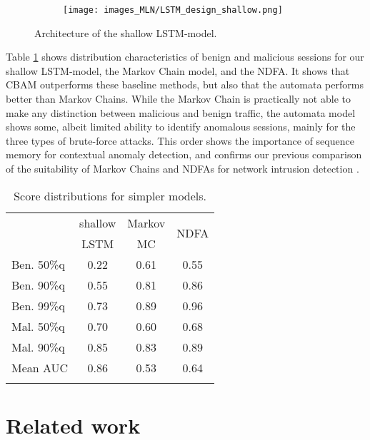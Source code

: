 \begin{figure}
\centering
\begin{subfigure}[b]{0.4\textwidth}
\texttt{[image: images\_MLN/LSTM\_design\_shallow.png]}
\end{subfigure}
\quad
\small
\caption{Architecture of the shallow LSTM-model.}\label{fig:rnn_FSA2}
\end{figure}
Table \ref{tab:Simpcomptab} shows distribution characteristics of benign and malicious sessions for our shallow LSTM-model, the Markov Chain model, and the NDFA. It shows that CBAM outperforms these baseline methods, but also that the automata performs better than Markov Chains. While the Markov Chain is practically not able to make any distinction between malicious and benign traffic, the automata model shows some, albeit limited ability to identify anomalous sessions, mainly for the three types of brute-force attacks. This order shows the importance of sequence memory for contextual anomaly detection, and confirms our previous comparison of the suitability of Markov Chains and NDFAs for network intrusion detection \cite{grov2019towards}.
\begin{table}[ht]
\centering
\begin{tabular}{l|ccc}
\hline
&shallow&Markov&\multirow{2}{*}{NDFA}\\
&LSTM&MC&\\
\hline
Ben. 50\%q&0.22&0.61&0.55\\[0.2cm]
Ben. 90\%q&0.55&0.81&0.86\\[0.2cm]
Ben. 99\%q&0.73&0.89&0.96\\[0.2cm]
Mal. 50\%q&0.70&0.60&0.68\\[0.2cm]
Mal. 90\%q&0.85&0.83&0.89\\[0.2cm]
Mean AUC&0.86&0.53&0.64\\ \hline
\multicolumn{2}{c}{ }
\end{tabular}
\caption{Score distributions for simpler models.}\label{tab:Simpcomptab}
\end{table}


\section{Related work}\label{Sec:Related work}

